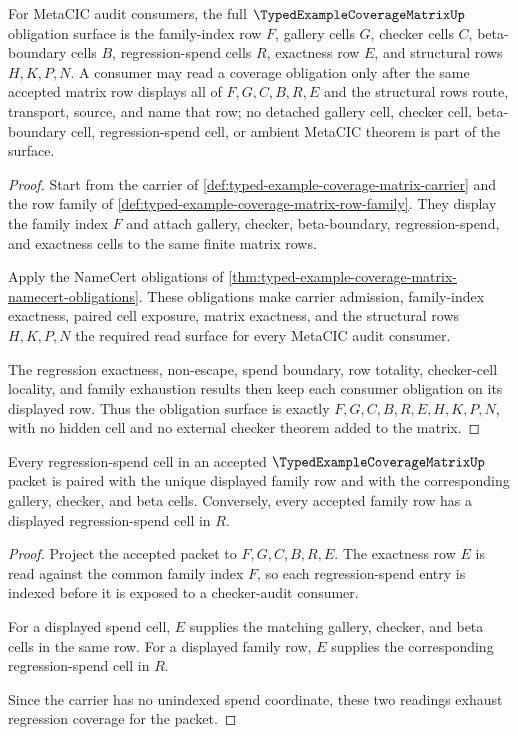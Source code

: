 \begin{theorem}
\label{thm:typed-example-coverage-matrix-obligation-surface}
For MetaCIC audit consumers, the full $\TypedExampleCoverageMatrixUp$ obligation surface is the family-index row $F$, gallery cells $G$, checker cells $C$, beta-boundary cells $B$, regression-spend cells $R$, exactness row $E$, and structural rows $H,K,P,N$. A consumer may read a coverage obligation only after the same accepted matrix row displays all of $F,G,C,B,R,E$ and the structural rows route, transport, source, and name that row; no detached gallery cell, checker cell, beta-boundary cell, regression-spend cell, or ambient MetaCIC theorem is part of the surface.
\end{theorem}
\begin{proof}
Start from the carrier of \autoref{def:typed-example-coverage-matrix-carrier} and the row family of \autoref{def:typed-example-coverage-matrix-row-family}. They display the family index $F$ and attach gallery, checker, beta-boundary, regression-spend, and exactness cells to the same finite matrix rows.

Apply the NameCert obligations of \autoref{thm:typed-example-coverage-matrix-namecert-obligations}. These obligations make carrier admission, family-index exactness, paired cell exposure, matrix exactness, and the structural rows $H,K,P,N$ the required read surface for every MetaCIC audit consumer.

The regression exactness, non-escape, spend boundary, row totality, checker-cell locality, and family exhaustion results then keep each consumer obligation on its displayed row. Thus the obligation surface is exactly $F,G,C,B,R,E,H,K,P,N$, with no hidden cell and no external checker theorem added to the matrix.
\end{proof}

\begin{theorem}
\label{thm:typed-example-coverage-matrix-regression-exactness}
Every regression-spend cell in an accepted $\TypedExampleCoverageMatrixUp$ packet is paired with the unique displayed family row and with the corresponding gallery, checker, and beta cells. Conversely, every accepted family row has a displayed regression-spend cell in $R$.
\end{theorem}
\begin{proof}
Project the accepted packet to $F,G,C,B,R,E$. The exactness row $E$ is read against the common family index $F$, so each regression-spend entry is indexed before it is exposed to a checker-audit consumer.

For a displayed spend cell, $E$ supplies the matching gallery, checker, and beta cells in the same row. For a displayed family row, $E$ supplies the corresponding regression-spend cell in $R$.

Since the carrier has no unindexed spend coordinate, these two readings exhaust regression coverage for the packet.
\end{proof}


